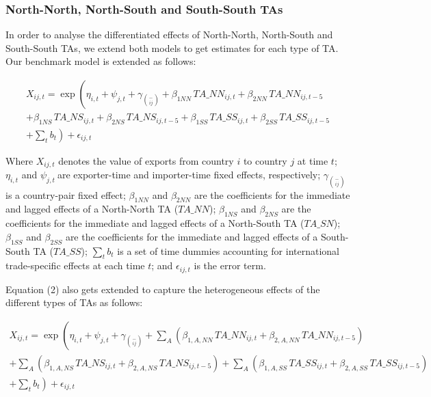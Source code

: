 \documentclass[12pt]{article}%
\begin{document}
\subsubsection{North{-}North, North{-}South and South{-}South TAs}%
\label{ssubsec:North{-}North,North{-}SouthandSouth{-}SouthTAs}%

%
In order to analyse the differentiated effects of North-North,
North-South and South-South TAs, we extend both models to get estimates
for each type of TA. Our benchmark model is extended as follows:

\begin{multline}
    X_{ij,t} = \exp\left(\eta_{i,t} + \psi_{j,t} + \gamma_{\binom{-}{ij}} + \beta_{1NN} \, TA\_NN_{ij,t} + \beta_{2NN} \, TA\_NN_{ij,t-5} \right. \\
    + \beta_{1NS} \, TA\_NS_{ij,t} + \beta_{2NS} \, TA\_NS_{ij,t-5} + \beta_{1SS} \, TA\_SS_{ij,t} + \beta_{2SS} \, TA\_SS_{ij,t-5} \\
    + \left. \sum_{t} b_{t} \right) + \epsilon_{ij,t}
\end{multline}

Where \(X_{ij,t}\)\hspace{0pt} denotes the value of exports from country
\(i\) to country \(j\) at time \(t\); \(\eta_{i,t}\) and
\(\psi_{j,t}\ \)are exporter-time and importer-time fixed effects,
respectively; \(\gamma_{\binom{-}{ij}}\) is a country-pair fixed effect;
\hspace{0pt}\(\beta_{1NN}\) and \(\beta_{2NN}\) are the coefficients for
the immediate and lagged effects of a North-North TA (\(TA\_ NN\));
\hspace{0pt}\hspace{0pt}\(\beta_{1NS}\) and \(\beta_{2NS}\) are the
coefficients for the immediate and lagged effects of a North-South TA
(\(TA\_ SN\)); \hspace{0pt}\hspace{0pt}\(\beta_{1SS}\) and
\(\beta_{2SS}\) are the coefficients for the immediate and lagged
effects of a South-South TA (\(TA\_ SS\)); \(\sum_{t}^{}b_{t}\) is a set
of time dummies accounting for international trade-specific effects at
each time \(t\); and \(\epsilon_{ij,t}\) is the error term.

Equation (2) also gets extended to capture the heterogeneous effects of
the different types of TAs as follows:

\begin{multline}
    X_{ij,t} = \exp\left(\eta_{i,t} + \psi_{j,t} + \gamma_{\binom{-}{ij}} + \sum_{A}\left(\beta_{1,A,NN} \, TA\_NN_{ij,t} + \beta_{2,A,NN} \, TA\_NN_{ij,t-5}\right) \right. \\
    + \sum_{A}\left(\beta_{1,A,NS} \, TA\_NS_{ij,t} + \beta_{2,A,NS} \, TA\_NS_{ij,t-5}\right) + \sum_{A}\left(\beta_{1,A,SS} \, TA\_SS_{ij,t} + \beta_{2,A,SS} \, TA\_SS_{ij,t-5}\right) \\
    + \left. \sum_{t} b_{t} \right) + \epsilon_{ij,t}
\end{multline}
\end{document}
